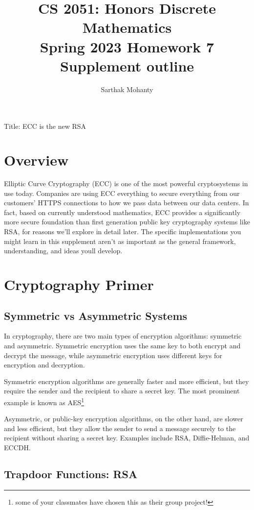 \documentclass{article}
\title{\vspace{-1cm}CS 2051: Honors Discrete Mathematics \\Spring 2023 Homework 7 Supplement outline}
\author{Sarthak Mohanty }
\date{}
\begin{document}
\maketitle


Title: ECC is the new RSA

\section*{Overview}

Elliptic Curve Cryptography (ECC) is one of the most powerful cryptosystems in use today. Companies are using ECC everything to secure everything from our customers' HTTPS connections to how we pass data between our data centers. In fact, based on currently understood mathematics, ECC provides a significantly more secure foundation than first generation public key cryptography systems like RSA, for reasons we'll explore in detail later. The specific implementations you might learn in this supplement aren't as important as the general framework, understanding, and ideas youll develop.


\section*{Cryptography Primer}


\subsection*{Symmetric vs Asymmetric Systems}

In cryptography, there are two main types of encryption algorithms: symmetric and asymmetric. Symmetric encryption uses the same key to both encrypt and decrypt the message, while asymmetric encryption uses different keys for encryption and decryption.

Symmetric encryption algorithms are generally faster and more efficient, but they require the sender and the recipient to share a secret key. The most prominent example is known as AES\footnote{some of your classmates have chosen this as their group project!} 


Asymmetric, or public-key encryption algorithms, on the other hand, are slower and less efficient, but they allow the sender to send a message securely to the recipient without sharing a secret key. Examples include RSA, Diffie-Helman, and ECCDH.

\subsection*{Trapdoor Functions: RSA}
\end{document}
